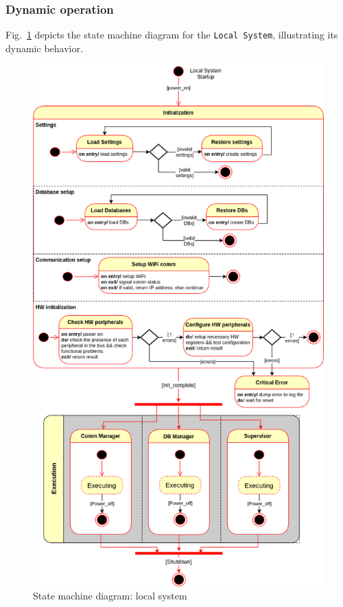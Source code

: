 \subsubsection{Dynamic operation}
\label{sec:dyn-oper}
Fig.~\ref{fig:state-mach-local} depicts the state machine diagram for the
\texttt{Local System}, illustrating its dynamic behavior.
%
\begin{figure}[htb!]
\centering
    \includegraphics[width=0.7\columnwidth]{./img/state-mach-local.png}
  \caption{State machine diagram: local system}%
\label{fig:state-mach-local}
\end{figure}
%

